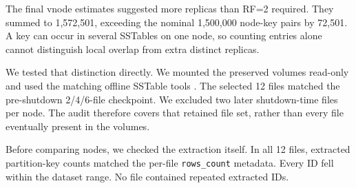 The final vnode estimates suggested more replicas than RF=2 required. They summed to 1,572,501, exceeding the nominal 1,500,000 node-key pairs by 72,501. A key can occur in several SSTables on one node, so counting entries alone cannot distinguish local overlap from extra distinct replicas.

We tested that distinction directly. We mounted the preserved volumes read-only and used the matching offline SSTable tools \cite{r23}. The selected 12 files matched the pre-shutdown 2/4/6-file checkpoint. We excluded two later shutdown-time files per node. The audit therefore covers that retained file set, rather than every file eventually present in the volumes.

Before comparing nodes, we checked the extraction itself. In all 12 files, extracted partition-key counts matched the per-file \texttt{rows\_count} metadata. Every ID fell within the dataset range. No file contained repeated extracted IDs.

